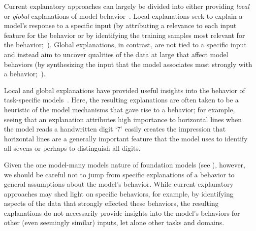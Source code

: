 Current explanatory approaches can largely be divided into either providing \textit{local} or \textit{global} explanations of model behavior~\citep{doshi2017towards}.
Local explanations seek to explain a model's response to a specific input (\eg by attributing a relevance to each input feature for the behavior or by identifying the training samples most relevant for the behavior;~\citep{simonyan2013deep,bach2015pixel,sundararajan2017axiomatic,shrikumar2017learning,springenberg2014striving,zeiler2014visualizing,lundberg2017unified,zintgraf2017visualizing,Fong_2017_ICCV,koh2017understanding}). Global explanations, in contrast, are not tied to a specific input and instead aim to uncover qualities of the data at large that affect model behaviors (\eg by synthesizing the input that the model associates most strongly with a behavior;~\citep{simonyan2013deep,nguyen2016synthesizing}). 

Local and global explanations have provided useful insights into the behavior of task-specific models~\citep[\eg][]{li2015visualizing,wang2015visual,lapuschkin2019unmasking,thomas2019analyzing,poplin2018prediction}.
Here, the resulting explanations are often taken to be a heuristic of the model mechanisms that gave rise to a behavior; for example, seeing that an explanation attributes high importance to horizontal lines when the model reads a handwritten digit `7' easily creates the impression that horizontal lines are a generally important feature that the model uses to identify all sevens or perhaps to distinguish all digits.

Given the one model-many models nature of foundation models (see ), however, we should be careful not to jump from specific explanations of a behavior to general assumptions about the model's behavior.
While current explanatory approaches may shed light on specific behaviors, for example, by identifying aspects of the data that strongly effected these behaviors, the resulting explanations do not necessarily provide insights into the model's behaviors for other (even seemingly similar) inputs, let alone other tasks and domains.


